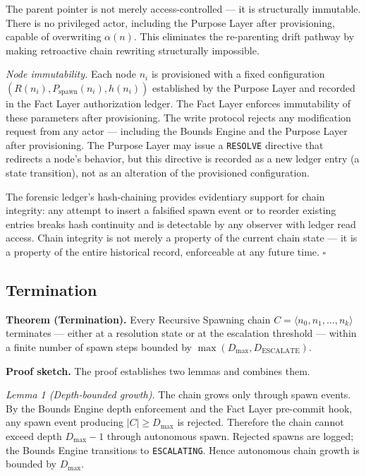 The parent pointer is not merely access-controlled --- it is structurally immutable. There is no privileged actor, including the Purpose Layer after provisioning, capable of overwriting $\alpha(n)$. This eliminates the re-parenting drift pathway by making retroactive chain rewriting structurally impossible.

\medskip
\textit{Node immutability.} Each node $n_i$ is provisioned with a fixed configuration $(R(n_i), P_{\mathrm{spawn}}(n_i), h(n_i))$ established by the Purpose Layer and recorded in the Fact Layer authorization ledger. The Fact Layer enforces immutability of these parameters after provisioning. The write protocol rejects any modification request from any actor --- including the Bounds Engine and the Purpose Layer after provisioning. The Purpose Layer may issue a \texttt{RESOLVE} directive that redirects a node's behavior, but this directive is recorded as a new ledger entry (a state transition), not as an alteration of the provisioned configuration.

The forensic ledger's hash-chaining provides evidentiary support for chain integrity: any attempt to insert a falsified spawn event or to reorder existing entries breaks hash continuity and is detectable by any observer with ledger read access. Chain integrity is not merely a property of the current chain state --- it is a property of the entire historical record, enforceable at any future time. $\square$

\subsection{Termination}
\label{sec:rs-termination}

\medskip
\noindent\textbf{Theorem (Termination).} Every Recursive Spawning chain $C = \langle n_0, n_1, \ldots, n_k \rangle$ terminates --- either at a resolution state or at the escalation threshold --- within a finite number of spawn steps bounded by $\max(D_{\mathrm{max}}, D_{\mathrm{ESCALATE}})$.

\medskip
\noindent\textbf{Proof sketch.} The proof establishes two lemmas and combines them.

\medskip
\textit{Lemma 1 (Depth-bounded growth).} The chain grows only through spawn events. By the Bounds Engine depth enforcement and the Fact Layer pre-commit hook, any spawn event producing $|C| \geq D_{\mathrm{max}}$ is rejected. Therefore the chain cannot exceed depth $D_{\mathrm{max}} - 1$ through autonomous spawn. Rejected spawns are logged; the Bounds Engine transitions to \texttt{ESCALATING}. Hence autonomous chain growth is bounded by $D_{\mathrm{max}}$.

